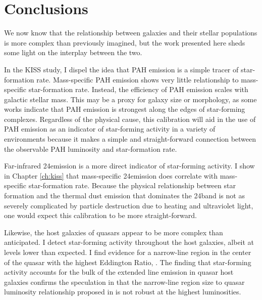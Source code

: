 \chapter{Conclusions}
\label{sec:wrapup}

We now know that the relationship between galaxies and their stellar populations is more complex than previously imagined, but the work presented here sheds some light on the interplay between the two.


In the KISS study, I dispel the idea that PAH emission is a simple tracer of star-formation rate.  Mass-specific PAH emission shows very little relationship to mass-specific star-formation rate.  Instead, the efficiency of PAH emission scales with galactic stellar mass.  This may be a proxy for galaxy size or morphology, as some works indicate that PAH emission is strongest along the edges of star-forming complexes.  Regardless of the physical cause, this calibration will aid in the use of PAH emission as an indicator of star-forming activity in a variety of environments because it makes a simple and straight-forward connection between the observable PAH luminosity and star-formation rate.

Far-infrared 24\micron emission is a more direct indicator of star-forming activity. I show in Chapter \ref{ch:kiss} that mass-specific 24\micron emission does correlate with mass-specific star-formation rate.  Because the physical relationship between star formation and the thermal dust emission that dominates the 24\micron band is not as severely complicated by particle destruction due to heating and ultraviolet light, one would expect this calibration to be more straight-forward.

Likewise, the host galaxies of quasars appear to be more complex than anticipated.  I detect star-forming activity throughout the host galaxies, albeit at levels lower than expected.  I find evidence for a narrow-line region in the center of the quasar with the highest Eddington Ratio, .  The finding that star-forming activity accounts for the bulk of the extended line emission in quasar host galaxies confirms the speculation in \cite{Netzer2004} that the narrow-line region size to quasar luminosity relationship proposed in \cite{Bennert} is not robust at the highest luminosities.

